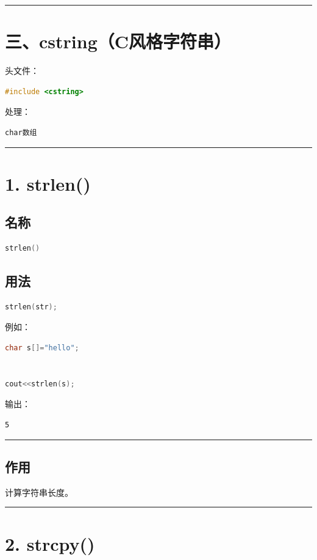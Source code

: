 \documentclass[10pt,twocolumn]{extarticle}
\begin{document}
\noindent\rule{\linewidth}{0.4pt}

\section{三、cstring（C风格字符串）}

头文件：
\begin{lstlisting}[language=C++]
#include <cstring>
\end{lstlisting}
处理：
\begin{lstlisting}[language=C++]
char数组
\end{lstlisting}

\noindent\rule{\linewidth}{0.4pt}

\section{1. strlen()}

\subsection{名称}
\begin{lstlisting}[language=C++]
strlen()
\end{lstlisting}

\subsection{用法}
\begin{lstlisting}[language=C++]
strlen(str);
\end{lstlisting}
例如：
\begin{lstlisting}[language=C++]
char s[]="hello";


cout<<strlen(s);
\end{lstlisting}
输出：
\begin{lstlisting}
5
\end{lstlisting}

\noindent\rule{\linewidth}{0.4pt}

\subsection{作用}
计算字符串长度。

\noindent\rule{\linewidth}{0.4pt}

\section{2. strcpy()}
\end{document}
